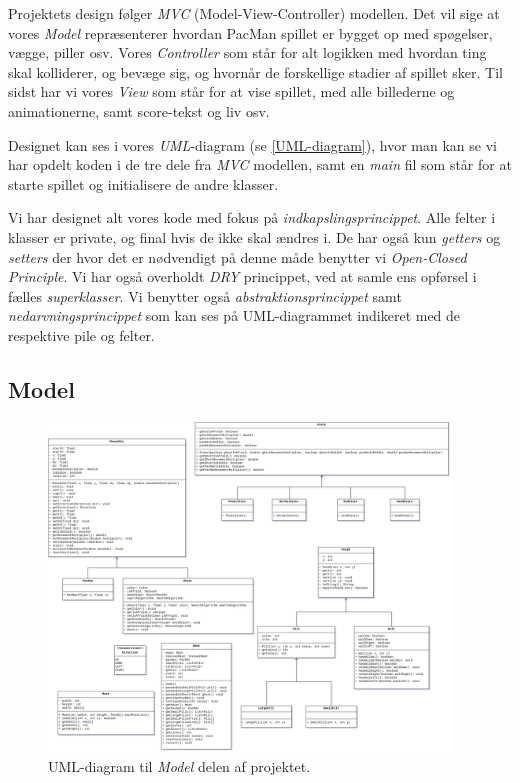 \documentclass{article}
\theoremstyle{mytheoremstyle}
\theoremstyle{mytheoremstyle}
\theoremstyle{myproblemstyle}
\begin{document}
Projektets design følger \textit{MVC} (Model-View-Controller) modellen. Det
vil sige at vores \textit{Model} repræsenterer hvordan PacMan spillet er bygget
op med spøgelser, vægge, piller osv. Vores \textit{Controller} som står for alt
logikken med hvordan ting skal kolliderer, og bevæge sig, og hvornår de
forskellige stadier af spillet sker. Til sidst har vi vores \textit{View} som
står for at vise spillet, med alle billederne og animationerne, samt score-tekst
og liv osv.

Designet kan ses i vores \textit{UML}-diagram (se \autoref{UML-diagram}), hvor
man kan se vi har opdelt koden i de tre dele fra \textit{MVC} modellen, samt en
\textit{main} fil som står for at starte spillet og initialisere de andre
klasser.

Vi har designet alt vores kode med fokus på \textit{indkapslingsprincippet}.
Alle felter i klasser er private, og final hvis de ikke skal ændres i. De har
også kun \textit{getters} og \textit{setters} der hvor det er nødvendigt på
denne måde benytter vi \textit{Open-Closed Principle}. Vi har også overholdt
\textit{DRY} princippet, ved at samle ens opførsel i fælles
\textit{superklasser}. Vi benytter også \textit{abstraktionsprincippet} samt
\textit{nedarvningsprincippet} som kan ses på UML-diagrammet indikeret med de
respektive pile og felter.

\subsection{Model}\label{sub:Model} %
\begin{figure}[H]
    \begin{center}
        \includegraphics[width=0.95\textwidth]{figures/UML-diagram-model.png}
    \end{center}
    \caption{UML-diagram til \textit{Model} delen af projektet.}
    \label{UML-diagram-Model}
\end{figure}
\end{document}
